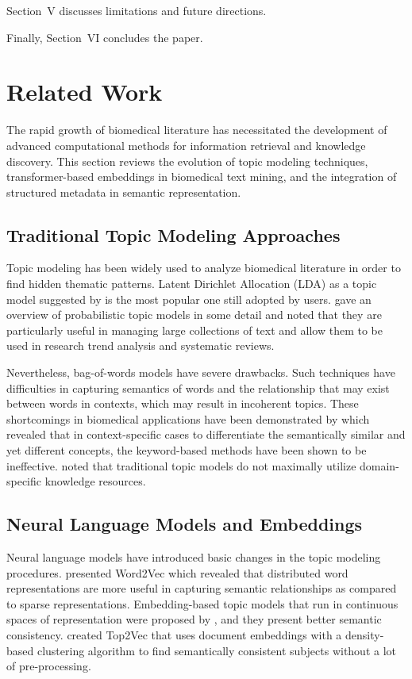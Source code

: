\documentclass[utf8]{FrontiersinHarvard}
\begin{document}
Section~V discusses limitations and future directions.

Finally, Section~VI concludes the paper.

\section{Related Work}

The rapid growth of biomedical literature has necessitated the development of advanced computational methods for information retrieval and knowledge discovery. This section reviews the evolution of topic modeling techniques, transformer-based embeddings in biomedical text mining, and the integration of structured metadata in semantic representation.

\subsection{Traditional Topic Modeling Approaches}

Topic modeling has been widely used to analyze biomedical literature in order to find hidden thematic patterns. Latent Dirichlet Allocation (LDA) as a topic model suggested by \citet{blei_latent_2003} is the most popular one still adopted by users. \citet{blei_probabilistic_2012} gave an overview of probabilistic topic models in some detail and noted that they are particularly useful in managing large collections of text and allow them to be used in research trend analysis and systematic reviews.

Nevertheless, bag-of-words models have severe drawbacks. Such techniques have difficulties in capturing semantics of words and the relationship that may exist between words in contexts, which may result in incoherent topics. These shortcomings in biomedical applications have been demonstrated by \citet{kavvadias_supporting_2020} which revealed that in context-specific cases to differentiate the semantically similar and yet different concepts, the keyword-based methods have been shown to be ineffective. \citet{kilicoglu_biomedical_2018} noted that traditional topic models do not maximally utilize domain-specific knowledge resources.

\subsection{Neural Language Models and Embeddings}

Neural language models have introduced basic changes in the topic modeling procedures. \citet{mikolov_efficient_2013} presented Word2Vec which revealed that distributed word representations are more useful in capturing semantic relationships as compared to sparse representations. Embedding-based topic models that run in continuous spaces of representation were proposed by \citet{dieng_topic_2020}, and they present better semantic consistency. \citet{angelov_top2vec_2020} created Top2Vec that uses document embeddings with a density-based clustering algorithm to find semantically consistent subjects without a lot of pre-processing.
\end{document}
